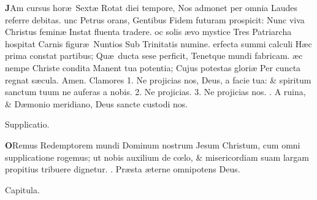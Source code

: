 \documentclass[letter,11pt]{book}
\makeatletter
\DeclareRobustCommand{\Vbar}{\vers@resp{-0.1em}{V}}
\DeclareRobustCommand{\Rbar}{\vers@resp{0pt}{R}}
\newcommand{\vers@resp@sym}{\raisebox{0.2ex}{\rotatebox[origin=c]{-20}{$\m@th\rceil$}}}
\newcommand{\vers@resp}[2]{%
  {\ooalign{\hidewidth\kern#1\vers@resp@sym\hidewidth\cr#2\cr}}%
}%
\def\V{\color{Red} \Vbar . \color{black}}
\def\R{\color{Red} \Rbar . \color{black}}
\makeatother
\begin{document}
\begin{multicols*}{2}
\lettrine[lines=2]{\bfseries \color{Red} J}{}Am cursus hor\ae \ Sext\ae 
\newline Rotat diei tempore,
\newline \indent Nos admonet per omnia
\newline \indent Laudes referre debitas.
unc Petrus orans, Gentibus
\newline \indent Fidem futuram prospicit:
\newline \indent Nunc viva Christus femin\ae 
\newline \indent Instat fluenta tradere.
oc solis \ae vo mystice
\newline \indent Tres Patriarcha hospitat
\newline \indent Carnis figur\ae \ Nuntios
\newline \indent Sub Trinitatis numine.
erfecta summi calculi
\newline \indent H\ae c prima constat partibus;
\newline \indent Qu\ae \ ducta sese perficit,
\newline \indent Tenetque mundi fabricam.
\ae c nempe Christe condita
\newline \indent Manent tua potentia;
\newline \indent Cujus potestas glori\ae 
\newline \indent Per cuncta regnat s\ae cula. Amen.
\newline \color{Red} Clamores 1. \color{black} Ne projicias nos, Deus, a facie tua: \& spiritum sanctum tuum ne auferas a nobis. \color{Red} 2. \color{black} Ne projicias. \color{Red} 3. \color{black} Ne projicias nos. \V A ruina, \& D\ae monio meridiano, Deus sancte custodi nos.
\vspace{-.5em} \begin{center} \color{Red} Supplicatio. \end{center} \vspace{-.5em}
\lettrine[lines=2]{\bfseries \color{Red} O}{}Remus Redemptorem mundi Dominum nostrum Jesum Christum, cum omni supplicatione rogemus; ut nobis auxilium de c\oe lo, \& misericordiam suam largam propitius tribuere dignetur. \R Pr\ae sta \ae terne omnipotens Deus.
\vspace{-.5em} \begin{center} \color{Red} Capitula. \end{center} \vspace{-.5em}

\end{multicols*}
\end{document}

